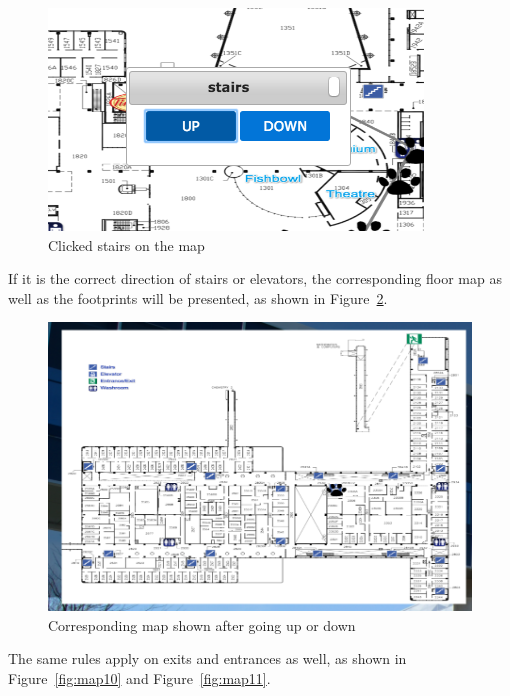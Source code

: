 \documentclass{sigchi}
\begin{document}
\begin{figure}[!h]
\centering
\includegraphics[width=1.0\columnwidth]{pics/map8.png}
\caption{Clicked stairs on the map}
\label{fig:map8}
\end{figure}


If it is the correct direction of stairs or elevators, the corresponding floor map as well as the footprints will be presented, as shown in Figure~\ref{fig:map9}.

\begin{figure}[!h]
\centering
\includegraphics[width=1.0\columnwidth]{pics/map9.png}
\caption{Corresponding map shown after going up or down}
\label{fig:map9}
\end{figure}

The same rules apply on exits and entrances as well, as shown in Figure~\ref{fig:map10} and Figure~\ref{fig:map11}.
\end{document}
